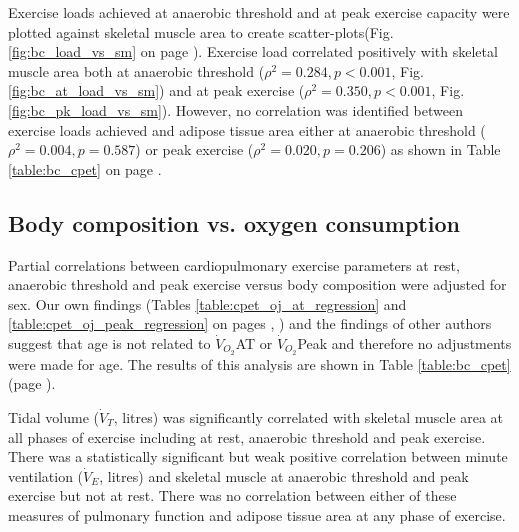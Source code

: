 Exercise loads achieved at anaerobic threshold and at peak exercise capacity were plotted against skeletal muscle area to create scatter-plots(Fig. \ref{fig:bc_load_vs_sm} on page \pageref{fig:bc_load_vs_sm}).  
Exercise load correlated positively with skeletal muscle area both at anaerobic threshold ($\rho^2 = 0.284, p < 0.001$, Fig. \ref{fig:bc_at_load_vs_sm}) and at peak exercise ($\rho^2 = 0.350, p < 0.001$, Fig. \ref{fig:bc_pk_load_vs_sm}). 
However, no correlation was identified between exercise loads achieved and adipose tissue area either at anaerobic threshold ($\rho^2 = 0.004, p = 0.587$) or peak exercise ($\rho^2 = 0.020, p = 0.206$) as shown in Table \ref{table:bc_cpet} on page \pageref{table:bc_cpet}. 


\subsection{Body composition vs. oxygen consumption}



Partial correlations between cardiopulmonary exercise parameters at rest, anaerobic threshold and peak exercise versus body composition were adjusted for sex. 
Our own findings (Tables \ref{table:cpet_oj_at_regression} and \ref{table:cpet_oj_peak_regression} on pages \pageref{table:cpet_oj_at_regression}, \pageref{table:cpet_oj_peak_regression}) and the findings of other authors suggest that age is not related to $\dot{V}_{O_2}$AT or $\dot{V}_{O_2}$Peak and therefore no adjustments were made for age. 
The results of this analysis are shown in Table \ref{table:bc_cpet} (page \pageref{table:bc_cpet}).

Tidal volume ($\dot{V}_T$, litres) was significantly correlated with skeletal muscle area at all phases of exercise including at rest, anaerobic threshold and peak exercise. 
There was a statistically significant but weak positive correlation between minute ventilation ($\dot{V}_E$, litres) and skeletal muscle at anaerobic threshold and peak exercise but not at rest. 
There was no correlation between either of these measures of pulmonary function and adipose tissue area at any phase of exercise.

